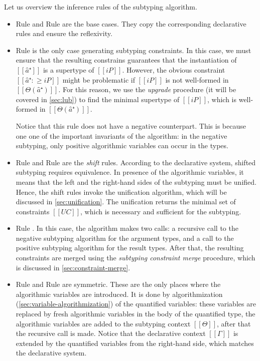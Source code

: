 \documentclass[a4,natbib=false]{article}
\newcommand{\ruleref}[1]{Rule \nameref{#1}}
\begin{document}
Let us overview the inference rules of the subtyping algorithm.
\begin{itemize}
  \item \ruleref{\ottdruleANVarLabel} and \ruleref{\ottdruleAPVarLabel} 
    are the base cases. They copy the corresponding declarative rules and
    ensure the reflexivity.
  \item \ruleref{\ottdruleAPUVarLabel} is the only case generating 
    subtyping constraints. In this case, we must ensure
    that the resulting constrains guarantees that the instantiation of 
    $[[â⁺]]$ is a supertype of $[[iP]]$.
    However, the obvious constraint $[[â⁺ :≥ iP]]$ might be problematic
    if  $[[iP]]$ is not well-formed in $[[Θ(â⁺)]]$. For this reason,
    we use the \emph{upgrade} procedure (it will be covered in \cref{sec:lub})
    to find the minimal supertype of $[[iP]]$, which is well-formed in $[[Θ(â⁺)]]$. 

    Notice that this rule does not have a negative counterpart. This is
    because one one of the important invariants of the algorithm: 
    in the negative subtyping, only positive algorithmic variables
    can occur in the types. 
    
  \item \ruleref{\ottdruleAShiftDLabel} and \ruleref{\ottdruleAShiftULabel} are the
    \emph{shift} rules. According to the declarative system,
    shifted subtyping requires equivalence. In presence of the algorithmic 
    variables, it means that the left and the right-hand sides of the subtyping
    must be unified. Hence, the shift rules invoke the unification algorithm, 
    which will be discussed in \cref{sec:unification}. The unification 
    returns the minimal set of constraints $[[UC]]$, which is necessary
    and sufficient for the subtyping. 

  \item \ruleref{\ottdruleAArrowLabel}.
    In this case, the algorithm makes two calls:
    a recursive call to the negative subtyping algorithm for the argument types,
    and a call to the positive subtyping algorithm for the result types.
    After that, the resulting constraints are merged using the
    \emph{subtyping constraint merge} procedure, 
    which is discussed in \cref{sec:constraint-merge}.
  \item \ruleref{\ottdruleAForallLabel} and \ruleref{\ottdruleAExistsLabel}
    are symmetric. These are the only places where 
    the algorithmic variables are introduced.
    It is done by algorithmization (\cref{sec:variable-algorithmization}) 
    of the quantified variables: these variables are replaced by 
    fresh algorithmic variables in the body of the quantified type,
    the algorithmic variables are added to the subtyping context $[[Θ]]$,
    after that the recursive call is made. Notice that the declarative context
    $[[Γ]]$ is extended by the quantified variables from the right-hand side,
    which matches the declarative system.
\end{itemize}
\end{document}
